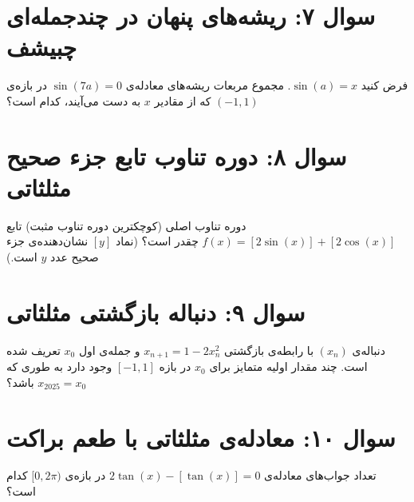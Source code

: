 \documentclass[12pt]{article}
\begin{document}
	
	\vspace{1cm}
	\hrulefill
	\vspace{1cm}
	\section*{سوال ۷: ریشه‌های پنهان در چندجمله‌ای چبیشف}
	فرض کنید \(\sin(a) = x\). مجموع مربعات ریشه‌های معادله‌ی \( \sin(7a) = 0 \) در بازه‌ی \( (-1, 1) \) که از مقادیر \(x\) به دست می‌آیند، کدام است؟
	
	
	\vspace{1cm}
	\hrulefill
	\vspace{1cm}
	\section*{سوال ۸: دوره تناوب تابع جزء صحیح مثلثاتی}
	دوره تناوب اصلی (کوچکترین دوره تناوب مثبت) تابع \( f(x) = [2\sin(x)] + [2\cos(x)] \) چقدر است؟ (نماد \( [y] \) نشان‌دهنده‌ی جزء صحیح عدد \(y\) است.)
	
	
	\vspace{1cm}
	\vspace{1cm}
	\section*{سوال ۹: دنباله بازگشتی مثلثاتی}
	دنباله‌ی \( (x_n) \) با رابطه‌ی بازگشتی \( x_{n+1} = 1 - 2x_n^2 \) و جمله‌ی اول \( x_0 \) تعریف شده است. چند مقدار اولیه متمایز برای \( x_0 \) در بازه \( [-1, 1] \) وجود دارد به طوری که \( x_{2025} = x_0 \) باشد؟
	
	
	
	\vspace{1cm}
	\hrulefill
	\vspace{1cm}
	\section*{سوال ۱۰: معادله‌ی مثلثاتی با طعم براکت}
	تعداد جواب‌های معادله‌ی \( 2\tan(x) - [\tan(x)] = 0 \) در بازه‌ی \( [0, 2\pi) \) کدام است؟
	
\end{document}
